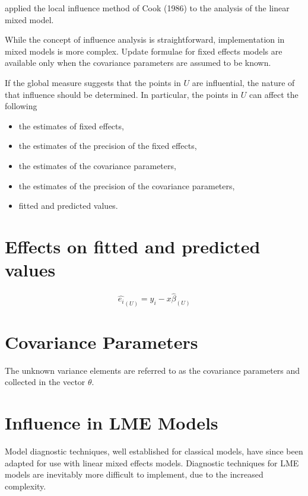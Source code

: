 \documentclass[12pt, a4paper]{article}
\begin{document}
			
			 \citet{Beckman} applied the local influence method of Cook (1986) to the analysis of the linear mixed model.
			
			While the concept of influence analysis is straightforward, implementation in mixed models is more complex. Update formulae for fixed effects models are available only when the covariance parameters are assumed to be known.
			
			If the global measure suggests that the points in $U$ are influential, the nature of that influence should be determined. In particular, the points in $U$ can affect the following
			
			\begin{itemize}
				\item the estimates of fixed effects,
				\item the estimates of the precision of the fixed effects,
				\item the estimates of the covariance parameters,
				\item the estimates of the precision of the covariance parameters,
				\item fitted and predicted values.
			\end{itemize}

			
\section{Effects on fitted and predicted values}
\begin{equation}
\hat{e_{i}}_{(U)} = y_{i} - x\hat{\beta}_{(U)}
\end{equation}
			

\section{Covariance Parameters} %
The unknown variance elements are referred to as the covariance parameters and collected in the vector $\theta$.

			
\section{Influence in LME Models}
			
Model diagnostic techniques, well established for classical models, have since been adapted for use with linear mixed effects models. Diagnostic techniques for LME models are inevitably more difficult to implement, due to the increased complexity.
			
\end{document}
